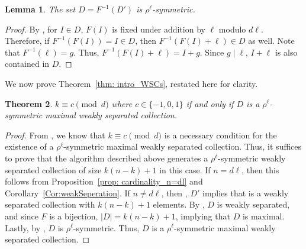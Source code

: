 \documentclass[11pt]{amsart}
\theoremstyle{plain}
\newtheorem{theorem}{Theorem}[section]
\newtheorem{lemma}[theorem]{Lemma}
\theoremstyle{definition}
\begin{document}
\begin{lemma}\label{lemma:set-symmetry}
 The set $D=F^{-1}(D')$ is $\rho^\ell$-symmetric.
\end{lemma}
\begin{proof}
By , for $I \in D$, $F(I)$ is fixed under addition by $\ell$ modulo $d\ell$. Therefore, if $F^{-1}(F(I))=I \in D$, then $F^{-1}(F(I)+\ell) \in D$ as well. Note that $F^{-1}(\ell)=g$. Thus, $F^{-1}(F(I)+\ell)=I+g$. Since $g \mid \ell$, $I+\ell$ is also contained in $D$.   
\end{proof}



We now prove Theorem~\ref{thm: intro_WSCs}, restated here for clarity.
\begin{theorem}
$k \equiv c \pmod d$ where $c \in \{-1,0, 1\}$ if and only if $D$ is a $\rho^\ell$-symmetric maximal weakly separated collection.
\end{theorem}
\begin{proof}
From , we know that $k\equiv c \pmod d$ is a necessary condition for the existence of a $\rho^\ell$-symmetric maximal weakly separated collection. Thus, it suffices to prove that the algorithm described above generates a $\rho^\ell$-symmetric weakly separated collection of size $k(n-k)+1$ in this case. If $n=d\ell$, then this follows from Proposition~\ref{prop: cardinality_n=dl} and Corollary~\ref{Cor:weakSeperation}. If $n\neq d\ell$, then , $D'$ implies that is a weakly separated collection with $k(n-k)+1$ elements. By , $D$ is weakly separated, and since $F$ is a bijection, $|D|=k(n-k)+1$, implying that $D$ is maximal. Lastly, by , $D$ is $\rho^\ell$-symmetric. Thus, $D$ is a $\rho^\ell$-symmetric maximal weakly separated collection. 
\end{proof}






\end{document}
